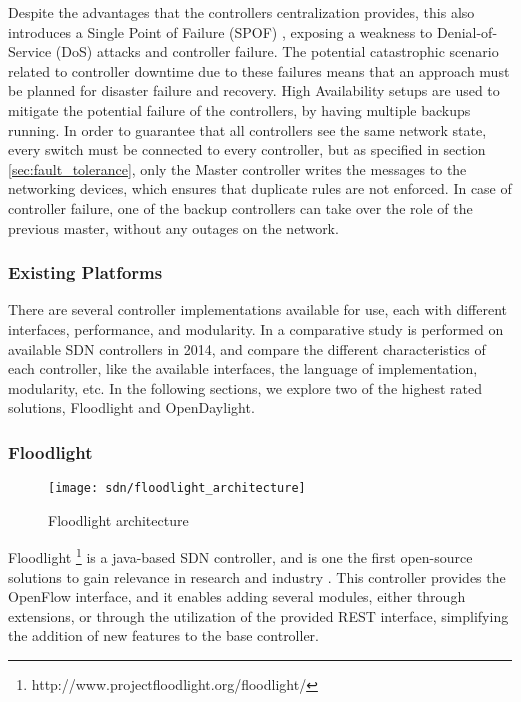 \begin {enumerate}
\begin{enumerate}
\par Despite the advantages that the controllers centralization provides, this also introduces a Single Point of Failure (SPOF) \cite{phemius_disco:_2014}, exposing
a weakness to Denial-of-Service (DoS) attacks and controller failure. The potential catastrophic scenario related to controller downtime due to these
failures means that an approach must be planned for disaster failure and recovery. High Availability setups are used to mitigate the potential failure of
the controllers, by having multiple backups running. In order to guarantee that all controllers see the same network state, every switch must be connected to 
every controller, but as specified in section \ref{sec:fault_tolerance}, only the Master controller writes the messages to the networking devices, which
ensures that duplicate rules are not enforced. In case of controller failure, one of the backup controllers can take over the role of the previous master,
without any outages on the network.


\subsubsection{Existing Platforms}

There are several controller implementations available for use, each with different interfaces, performance, and modularity. In \cite{khondoker_feature-based_2014} a
comparative study is performed on available SDN controllers in 2014, and compare the different characteristics of each controller, like the available
interfaces, the language of implementation, modularity, etc. In the following sections, we explore two of the highest rated solutions, Floodlight and
OpenDaylight.

\subsubsection {Floodlight}

\begin{figure}[H]
  \centering
  \texttt{[image: sdn/floodlight\_architecture]}\label{fig:flood_arch}
    \caption {Floodlight architecture \cite{project_floodlight_floodlight_2017}}
\end{figure}

Floodlight \footnote{http://www.projectfloodlight.org/floodlight/} is a java-based SDN controller, and is one the first open-source solutions to gain relevance in
research and industry \cite{berde_onos:_2014}. This controller provides the OpenFlow interface, and it enables adding several modules, either through extensions,
or through the utilization of the provided REST interface, simplifying the addition of new features to the base controller.


\end{enumerate}
\end{enumerate}
